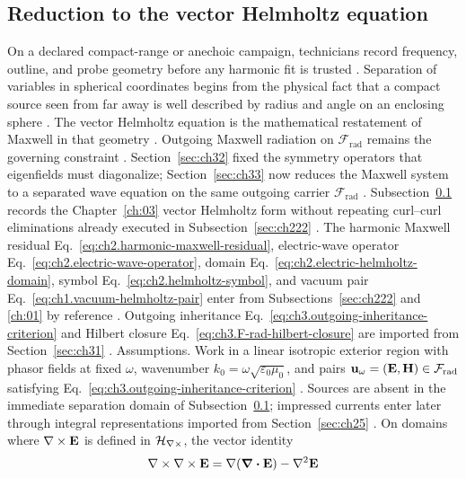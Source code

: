\subsection{Reduction to the vector Helmholtz equation}
\label{sec:ch331}
On a declared compact-range or anechoic campaign, technicians record frequency, outline, and probe geometry before any harmonic fit is trusted \cite{hansen1988}. Separation of variables in spherical coordinates begins from the physical fact that a compact source seen from far away is well described by radius and angle on an enclosing sphere \cite{stratton1941}. The vector Helmholtz equation is the mathematical restatement of Maxwell in that geometry \cite{harrington2001}. Outgoing Maxwell radiation on $\mathcal{F}_{\mathrm{rad}}$ remains the governing constraint \cite{stratton1941}.
Section~\ref{sec:ch32} fixed the symmetry operators that eigenfields must diagonalize; Section~\ref{sec:ch33}
now reduces the Maxwell system to a separated wave equation on the same outgoing carrier
\(\mathcal{F}_{\mathrm{rad}}\) \cite{stratton1941}. Subsection~\ref{sec:ch331} records the
Chapter~\ref{ch:03} vector Helmholtz form without repeating curl--curl eliminations already executed in
Subsection~\ref{sec:ch222} \cite{stratton1941}.
The harmonic Maxwell residual Eq.~\eqref{eq:ch2.harmonic-maxwell-residual}, electric-wave operator
Eq.~\eqref{eq:ch2.electric-wave-operator}, domain Eq.~\eqref{eq:ch2.electric-helmholtz-domain}, symbol
Eq.~\eqref{eq:ch2.helmholtz-symbol}, and vacuum pair Eq.~\eqref{eq:ch1.vacuum-helmholtz-pair} enter from
Subsections~\ref{sec:ch222} and \ref{ch:01} by reference \cite{stratton1941}. Outgoing inheritance
Eq.~\eqref{eq:ch3.outgoing-inheritance-criterion} and Hilbert closure
Eq.~\eqref{eq:ch3.F-rad-hilbert-closure} are imported from Section~\ref{sec:ch31}
\cite{kato1995}.
Assumptions. Work in a linear isotropic exterior region with phasor fields at fixed \(\omega\), wavenumber
\(k_0=\omega\sqrt{\varepsilon_0\mu_0}\), and pairs \(\mathbf{u}_\omega=(\mathbf{E},\mathbf{H})\in\mathcal{F}_{\mathrm{rad}}\) satisfying
Eq.~\eqref{eq:ch3.outgoing-inheritance-criterion} \cite{stratton1941}. Sources are absent in the
immediate separation domain of Subsection~\ref{sec:ch331}; impressed currents enter later through integral
representations imported from Section~\ref{sec:ch25} \cite{stratton1941}.
On domains where \(\nabla\times\mathbf{E}\) is defined in \(\mathcal{H}_{\nabla\times}\), the vector identity
\begin{equation}
\label{eq:ch3.curl-curl-vector-identity}
\nabla\times\nabla\times\mathbf{E}=\nabla(\div\mathbf{E})-\nabla^{2}\mathbf{E}
\end{equation}

